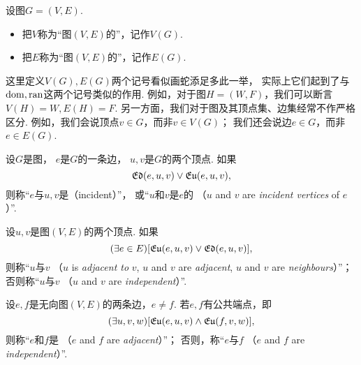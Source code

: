\begin{definition}
设图\(G = (V,E)\).
\begin{itemize}
	\item 把\(V\)称为“图\((V,E)\)的”，记作\(V(G)\).
	\item 把\(E\)称为“图\((V,E)\)的”，记作\(E(G)\).
\end{itemize}
\end{definition}
\begin{remark}
这里定义\(V(G),E(G)\)两个记号看似画蛇添足多此一举，
实际上它们起到了与\(\operatorname{dom},\operatorname{ran}\)这两个记号类似的作用.
例如，对于图\(H = (W,F)\)，我们可以断言\(V(H) = W,E(H) = F\).
另一方面，我们对于图及其顶点集、边集经常不作严格区分.
例如，我们会说顶点\(v \in G\)，而非\(v \in V(G)\)；
我们还会说边\(e \in G\)，而非\(e \in E(G)\).
\end{remark}

\begin{definition}
设\(G\)是图，
\(e\)是\(G\)的一条边，
\(u,v\)是\(G\)的两个顶点.
如果\begin{equation*}
	\mathfrak{Ed}(e,u,v)
	\lor
	\mathfrak{Eu}(e,u,v),
\end{equation*}
则称“\(e\)与\(u,v\)是（incident）”，
或“\(u\)和\(v\)是\(e\)的%
（\(u\) and \(v\) are \emph{incident vertices} of \(e\)）”.
\end{definition}

\begin{definition}
设\(u,v\)是图\((V,E)\)的两个顶点.
如果\begin{equation*}
	(\exists e \in E)
	[
		\mathfrak{Eu}(e,u,v)
		\lor
		\mathfrak{Ed}(e,u,v)
	],
\end{equation*}
则称“\(u\)与\(v\) %
（\(u\) is \emph{adjacent to} \(v\),
\(u\) and \(v\) are \emph{adjacent},
\(u\) and \(v\) are \emph{neighbours}）”；
否则称“\(u\)与\(v\) %
（\(u\) and \(v\) are \emph{independent}）”.
\end{definition}

\begin{definition}
设\(e,f\)是无向图\((V,E)\)的两条边，\(e \neq f\).
若\(e,f\)有公共端点，即\begin{equation*}
	(\exists u,v,w)
	[
		\mathfrak{Eu}(e,u,v)
		\land
		\mathfrak{Eu}(f,v,w)
	],
\end{equation*}
则称“\(e\)和\(f\)是%
（\(e\) and \(f\) are \emph{adjacent}）”；
否则，称“\(e\)与\(f\) %
（\(e\) and \(f\) are \emph{independent}）”.
\end{definition}

